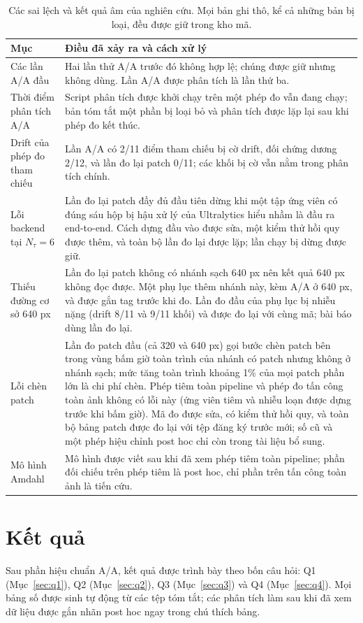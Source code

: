 \documentclass[12pt,a4paper]{article}
\newcommand{\Ntau}{N_{\tau}}
\begin{document}
\begin{table}[t]
\centering\small
\caption{Các sai lệch và kết quả âm của nghiên cứu. Mọi bản ghi thô, kể cả những bản bị loại, đều được giữ trong kho mã.}
\label{tab:dev}
\begin{tabularx}{\textwidth}{@{}lX@{}}
\toprule
Mục & Điều đã xảy ra và cách xử lý \\
\midrule
Các lần A/A đầu & Hai lần thử A/A trước đó không hợp lệ; chúng được giữ nhưng không dùng. Lần A/A được phân tích là lần thứ ba. \\
Thời điểm phân tích A/A & Script phân tích được khởi chạy trên một phép đo vẫn đang chạy; bản tóm tắt một phần bị loại bỏ và phân tích được lặp lại sau khi phép đo kết thúc. \\
Drift của phép đo tham chiếu & Lần A/A có 2/11 điểm tham chiếu bị cờ drift, đối chứng dương 2/12, và lần đo lại patch 0/11; các khối bị cờ vẫn nằm trong phân tích chính. \\
Lỗi backend tại $\Ntau=6$ & Lần đo lại patch đầy đủ đầu tiên dừng khi một tập ứng viên có đúng sáu hộp bị hậu xử lý của Ultralytics hiểu nhầm là đầu ra end-to-end. Cách dựng đầu vào được sửa, một kiểm thử hồi quy được thêm, và toàn bộ lần đo lại được lặp; lần chạy bị dừng được giữ. \\
Thiếu đường cơ sở 640 px & Lần đo lại patch không có nhánh sạch 640 px nên kết quả 640 px không đọc được. Một phụ lục thêm nhánh này, kèm A/A ở 640 px, và được gắn tag trước khi đo. Lần đo đầu của phụ lục bị nhiễu nặng (drift 8/11 và 9/11 khối) và được đo lại với cùng mã; bài báo dùng lần đo lại. \\
Lỗi chèn patch & Lần đo patch đầu (cả 320 và 640 px) gọi bước chèn patch bên trong vùng bấm giờ toàn trình của nhánh có patch nhưng không ở nhánh sạch; mức tăng toàn trình khoảng 1\% của mọi patch phần lớn là chi phí chèn. Phép tiêm toàn pipeline và phép đo tấn công toàn ảnh không có lỗi này (ứng viên tiêm và nhiễu loạn được dựng trước khi bấm giờ). Mã đo được sửa, có kiểm thử hồi quy, và toàn bộ bảng patch được đo lại với tệp đăng ký trước mới; số cũ và một phép hiệu chỉnh post hoc chỉ còn trong tài liệu bổ sung. \\
Mô hình Amdahl & Mô hình được viết sau khi đã xem phép tiêm toàn pipeline; phần đối chiếu trên phép tiêm là post hoc, chỉ phần trên tấn công toàn ảnh là tiến cứu. \\
\bottomrule
\end{tabularx}
\end{table}


\section{Kết quả}
\label{sec:results}
Sau phần hiệu chuẩn A/A, kết quả được trình bày theo bốn câu hỏi: Q1 (Mục~\ref{sec:q1}), Q2 (Mục~\ref{sec:q2}), Q3 (Mục~\ref{sec:q3}) và Q4 (Mục~\ref{sec:q4}). Mọi bảng số được sinh tự động từ các tệp tóm tắt; các phân tích làm sau khi đã xem dữ liệu được gắn nhãn post hoc ngay trong chú thích bảng.
\end{document}
